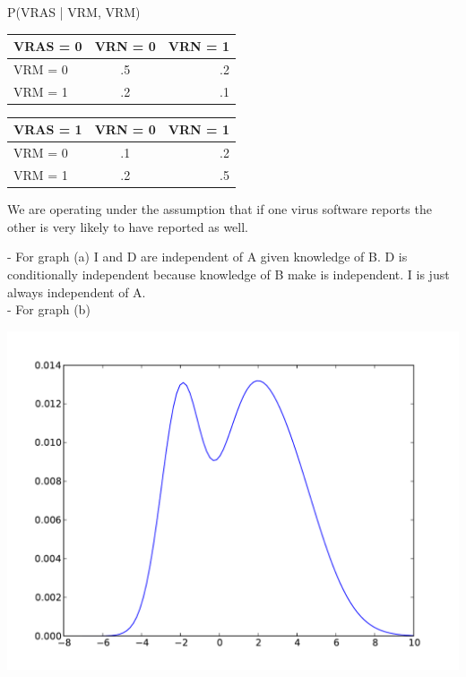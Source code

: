 \documentclass[solution, letterpaper]{cs121}
\begin{document}
\begin{empfile}
P(VRAS | VRM, VRM)\\
\begin{center}
\begin{tabular}{ l |c r }
   VRAS = 0 & VRN = 0& VRN = 1 \\
   \hline
  VRM = 0 & .5 & .2 \\
  VRM = 1 & .2 & .1 \\
\end{tabular}
\end{center}

\begin{center}
\begin{tabular}{ l |c r }
   VRAS = 1 & VRN = 0 & VRN = 1 \\
   \hline
  VRM = 0 & .1 & .2 \\
  VRM = 1 & .2 & .5 \\
\end{tabular}
\end{center}
We are operating under the assumption that if one virus software reports the other is very likely to have reported as well.

\subproblem 
- For graph (a) I and D are independent of A given knowledge of B. D is conditionally independent because knowledge of B make is independent. I is just always independent of A.\\
- For graph (b) 



\subproblem %

  \includegraphics[width=170mm]{mixture_o_gaussians.pdf}



\end{empfile}

\immediate{}
\end{document}
